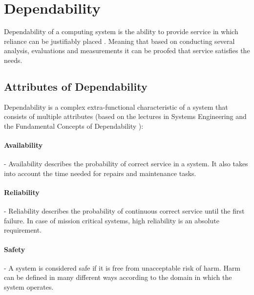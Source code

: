 \section{Dependability}

Dependability of a computing system is the ability to provide service in which reliance can be justifiably placed \cite{DependabilityBMEMIT}. Meaning that based on conducting several analysis, evaluations and measurements it can be proofed that service satisfies the needs.

\subsection{Attributes of Dependability} \label{dependability-attributes}

Dependability is a complex extra-functional characteristic of a system that consists of multiple attributes (based on the lectures in Systems Engineering \cite{DependabilityBMEMIT} and the Fundamental Concepts of Dependability \cite{FundamentalConceptsOfDependability}):

\paragraph{Availability} - Availability describes the probability of correct service in a system. It also takes into account the time needed for repairs and maintenance tasks.

\paragraph{Reliability} - Reliability describes the probability of continuous correct service until the first failure. In case of mission critical systems, high reliability is an absolute requirement.

\paragraph{Safety} - A system is considered safe if it is free from unacceptable risk of harm. Harm can be defined in many different ways according to the domain in which the system operates.

